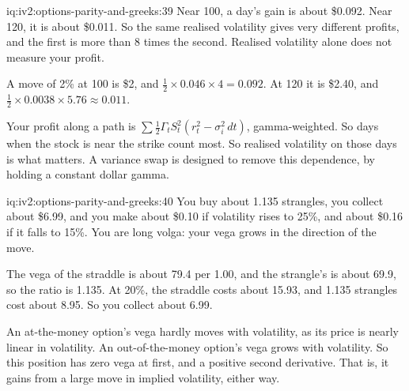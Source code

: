 \begin{solution}{iq:iv2:options-parity-and-greeks:39}
Near 100, a day's gain is about \$0.092. Near 120, it is about \$0.011. So the same realised volatility gives very different profits, and the first is more than 8 times the second. Realised volatility alone does not measure your profit.

A move of 2\% at 100 is \$2, and $\tfrac12 \times 0.046 \times 4 = 0.092$. At 120 it is \$2.40, and $\tfrac12 \times 0.0038 \times 5.76 \approx 0.011$.

Your profit along a path is $\sum\tfrac12\Gamma_tS_t^2(r_t^2 - \sigma_i^2\,dt)$, gamma-weighted. So days when the stock is near the strike count most. So realised volatility on those days is what matters. A variance swap is designed to remove this dependence, by holding a constant dollar gamma.

\end{solution}

\begin{solution}{iq:iv2:options-parity-and-greeks:40}
You buy about 1.135 strangles, you collect about \$6.99, and you make about \$0.10 if volatility rises to 25\%, and about \$0.16 if it falls to 15\%. You are long volga: your vega grows in the direction of the move.

The vega of the straddle is about 79.4 per 1.00, and the strangle's is about 69.9, so the ratio is 1.135. At 20\%, the straddle costs about 15.93, and 1.135 strangles cost about 8.95. So you collect about 6.99.

An at-the-money option's vega hardly moves with volatility, as its price is nearly linear in volatility. An out-of-the-money option's vega grows with volatility. So this position has zero vega at first, and a positive second derivative. That is, it gains from a large move in implied volatility, either way.

\end{solution}

